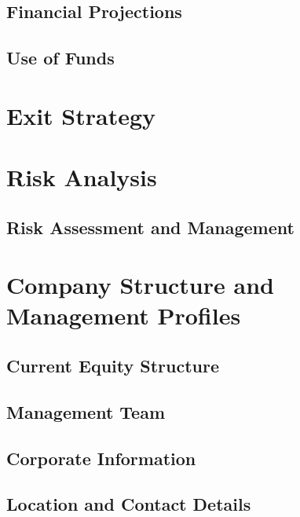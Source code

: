 \documentclass[11pt]{article}
\begin{document}
  \subsection{Financial Projections}
  \subsection{Use of Funds}
\newpage
\section{Exit Strategy}
\newpage
\section{Risk Analysis}
  \subsection{Risk Assessment and Management}
\newpage
\section{Company Structure and Management Profiles}
  \subsection{Current Equity Structure}
  \subsection{Management Team}
  \subsection{Corporate Information}
  \subsection{Location and Contact Details}
\newpage
\end{document}
